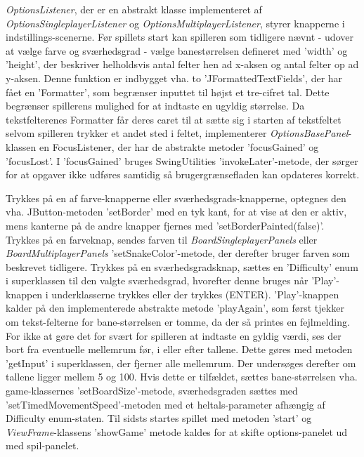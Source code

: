 \textit{OptionsListener}, der er en abstrakt klasse implementeret af \textit{OptionsSingleplayerListener} og \textit{OptionsMultiplayerListener}, styrer knapperne i indstillings-scenerne. Før spillets start kan spilleren som tidligere nævnt - udover at vælge farve og sværhedsgrad - vælge banestørrelsen defineret med 'width' og 'height', der beskriver helholdsvis antal felter hen ad x-aksen og antal felter op ad y-aksen. Denne funktion er indbygget vha. to 'JFormattedTextFields', der har fået en 'Formatter', som begrænser inputtet til højst et tre-cifret tal. Dette begrænser spillerens mulighed for at indtaste en ugyldig størrelse. Da tekstfelterenes Formatter får deres caret til at sætte sig i starten af tekstfeltet selvom spilleren trykker et andet sted i feltet, implementerer \textit{OptionsBasePanel}-klassen en FocusListener, der har de abstrakte metoder 'focusGained' og 'focusLost'. I 'focusGained' bruges SwingUtilities 'invokeLater'-metode, der sørger for at opgaver ikke udføres samtidig så brugergrænsefladen kan opdateres korrekt.
\linebreak

Trykkes på en af farve-knapperne eller sværhedsgrads-knapperne, optegnes den vha. JButton-metoden 'setBorder' med en tyk kant, for at vise at den er aktiv, mens kanterne på de andre knapper fjernes med 'setBorderPainted(false)'. Trykkes på en farveknap, sendes farven til \textit{BoardSingleplayerPanels} eller \textit{BoardMultiplayerPanels} 'setSnakeColor'-metode, der derefter bruger farven som beskrevet tidligere. Trykkes på en sværhedsgradsknap, sættes  en 'Difficulty' enum i superklassen til den valgte sværhedsgrad, hvorefter denne bruges når 'Play'-knappen i underklasserne trykkes eller der trykkes (ENTER). 'Play'-knappen kalder på den implementerede abstrakte metode 'playAgain', som først tjekker om tekst-felterne for bane-størrelsen er tomme, da der så printes en fejlmelding. For ikke at gøre det for svært for spilleren at indtaste en gyldig værdi, ses der bort fra eventuelle mellemrum før, i eller efter tallene. Dette gøres med metoden 'getInput' i superklassen, der fjerner alle mellemrum. Der undersøges derefter om tallene ligger mellem 5 og 100. Hvis dette er tilfældet, sættes bane-størrelsen vha. game-klassernes 'setBoardSize'-metode, sværhedsgraden sættes med 'setTimedMovementSpeed'-metoden med et heltals-parameter afhængig af Difficulty enum-staten. Til sidsts startes spillet med metoden 'start' og \textit{ViewFrame}-klassens 'showGame' metode kaldes for at skifte options-panelet ud med spil-panelet.